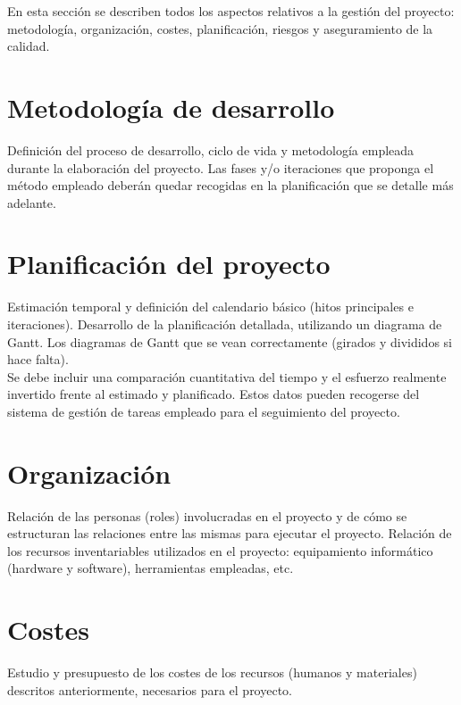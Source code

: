

En esta sección se describen todos los aspectos relativos a la gestión del proyecto: metodología, organización, costes, planificación, riesgos y aseguramiento de la calidad.

\section{Metodología de desarrollo}
Definición del proceso de desarrollo, ciclo de vida y metodología empleada durante la elaboración del proyecto. Las fases y/o iteraciones que proponga el método empleado deberán quedar recogidas en la planificación que se detalle más adelante.

\section{Planificación del proyecto}
Estimación temporal y definición del calendario básico (hitos principales e iteraciones). Desarrollo de la planificación detallada, utilizando un diagrama de Gantt. Los diagramas de Gantt que se vean correctamente (girados y divididos si hace falta).\\

Se debe incluir una comparación cuantitativa del tiempo y el esfuerzo realmente invertido frente al estimado y planificado. Estos datos pueden recogerse del sistema de gestión de tareas empleado para el seguimiento del proyecto.

\section{Organización}
Relación de las personas (roles) involucradas en el proyecto y de cómo se estructuran las relaciones entre las mismas para ejecutar el proyecto. Relación de los recursos inventariables utilizados en el proyecto: equipamiento informático (hardware y software), herramientas empleadas, etc. \\

\section{Costes}
Estudio y presupuesto de los costes de los recursos (humanos y materiales) descritos anteriormente, necesarios para el proyecto.

